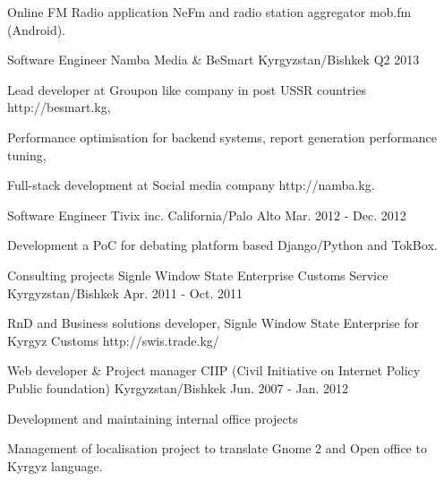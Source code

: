 \begin{cventries}
{\begin{cvitems}
        \item {Online FM Radio application NeFm and radio station aggregator mob.fm (Android).}
      \end{cvitems}
    }
  \cventry
    {Software Engineer}
    {Namba Media \& BeSmart}
    {Kyrgyzstan/Bishkek}
    {Q2 2013}
    {
      \begin{cvitems}
        \item {Lead developer at Groupon like company in post USSR countries http://besmart.kg,}
        \item {Performance optimisation for backend systems, report generation performance tuning,}
        \item {Full-stack development at Social media company http://namba.kg.}
      \end{cvitems}
    }
  \cventry
    {Software Engineer}
    {Tivix inc.}
    {California/Palo Alto}
    {Mar. 2012 - Dec. 2012}
    {
      \begin{cvitems}
        \item {Development a PoC for debating platform based Django/Python and TokBox.}
      \end{cvitems}
    }
  \cventry
    {Consulting projects}
    {Signle Window State Enterprise Customs Service}
    {Kyrgyzstan/Bishkek}
    {Apr. 2011 - Oct. 2011}
    {
      \begin{cvitems}
        \item {RnD and Business solutions developer, Signle Window State Enterprise for Kyrgyz Customs http://swis.trade.kg/}
      \end{cvitems}
    }

  \cventry
    {Web developer \& Project manager}
    {CIIP (Civil Initiative on Internet Policy Public foundation)}
    {Kyrgyzstan/Bishkek}
    {Jun. 2007 - Jan. 2012}
    {
      \begin{cvitems}
        \item {Development and maintaining internal office projects}
        \item {Management of localisation project to translate Gnome 2 and Open office to Kyrgyz language.}
      \end{cvitems}
    }
\end{cventries}
